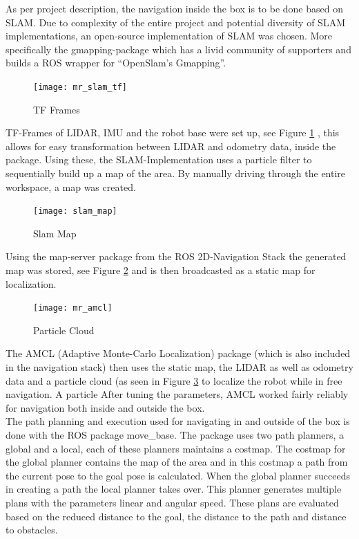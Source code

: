     As per project description, the navigation inside the box is to be done based on SLAM. 
    Due to complexity of the entire project and potential diversity of SLAM implementations, an open-source implementation of SLAM was chosen. 
    More specifically the gmapping-package \cite{gmapping} which has a livid community of supporters and builds a ROS wrapper for “OpenSlam's Gmapping”\cite{openslam}. 
	\begin{figure}[H]
        \centering
        \texttt{[image: mr\_slam\_tf]}
        \caption{TF Frames}
        \label{fig:tf_frames}
    \end{figure}
    TF-Frames of LIDAR, IMU and the robot base were set up, see Figure \ref{fig:tf_frames} , this allows for easy transformation between LIDAR and odometry data, inside the package. 
    Using these, the SLAM-Implementation uses a particle filter to sequentially build up a map of the area. 
    By manually driving through the entire workspace, a map was created. 
    \begin{figure}[H]
        \centering
        \texttt{[image: slam\_map]}
        \caption{Slam Map}
        \label{fig:slam_map}
    \end{figure}
    Using the map-server package from the ROS 2D-Navigation Stack \cite{navigation_stack} the generated map was stored, see Figure \ref{fig:slam_map} and is then broadcasted as a static map for localization.
   \begin{figure}[H]
        \centering
        \texttt{[image: mr\_amcl]}
        \caption{Particle Cloud}
        \label{fig:particle_cloud}
    \end{figure}
    The AMCL (Adaptive Monte-Carlo Localization) package (which is also included in the navigation stack) then uses the static map, the LIDAR as well as odometry data and a particle cloud (as seen in Figure \ref{fig:particle_cloud} to localize the robot while in free navigation. A particle  
    After tuning the parameters, AMCL worked fairly reliably for navigation both inside and outside the box.\\
	The path planning and execution used for navigating in and outside of the box is done with the ROS package move{\_}base. The package uses two path planners, a global and a local, each of these planners maintains a costmap. The costmap for the global planner contains the map of the area and in this costmap a path from the current pose to the goal pose is calculated. When the global planner succeeds in creating a path the local planner takes over. This planner generates multiple plans with the parameters linear and angular speed. These plans are evaluated based on the reduced distance to the goal, the distance to the path and distance to obstacles. \\
